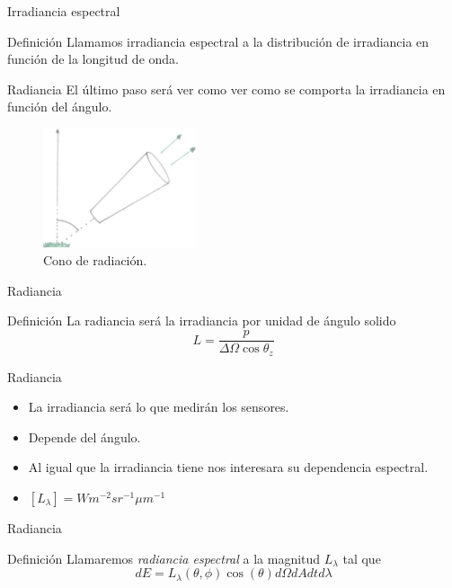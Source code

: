 \documentclass[]{beamer}
\begin{document}
\begin{frame}{Irradiancia espectral}
  \begin{block}{Definición}
    Llamamos irradiancia espectral a la distribución de irradiancia en función de la longitud de onda.
  \end{block}
\end{frame}

\begin{frame}{Radiancia}
  El último paso será ver como ver como se comporta la irradiancia en función del ángulo.
  \begin{figure}
    \includegraphics[width=0.4\textwidth]{imagenes/radiancia.png}
    \caption{Cono de radiación.}
  \end{figure}
\end{frame}

\begin{frame}{Radiancia}
  \begin{block}{Definición}
    La radiancia será la irradiancia por unidad de ángulo solido
    \begin{equation}
      L = \frac{p}{\Delta \Omega \cos\theta_z}
    \end{equation}
  \end{block}
\end{frame}

\begin{frame}{Radiancia}
  \begin{itemize}[<+>]
    \item La irradiancia será lo que medirán los sensores.
    \item Depende del ángulo.
    \item Al igual que la irradiancia tiene nos interesara su dependencia espectral.
    \item $[L_\lambda] = W m^{-2} sr^{-1} \mu m^{-1}$
  \end{itemize}
\end{frame}

\begin{frame}{Radiancia}
  \begin{block}{Definición}
    Llamaremos \emph{radiancia espectral} a la magnitud $L_\lambda$ tal que
    \begin{equation}
      dE = L_{\lambda}(\theta,\phi) \cos(\theta) d\Omega dA dt d\lambda
    \end{equation}
  \end{block}
\end{frame}
\end{document}
